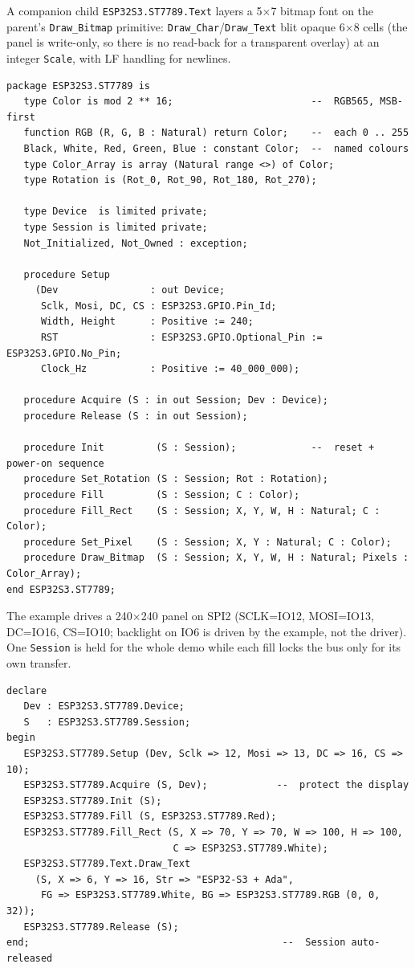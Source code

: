 A companion child \texttt{ESP32S3.ST7789.Text} layers a 5$\times$7 bitmap font on
the parent's \texttt{Draw\_Bitmap} primitive: \texttt{Draw\_Char}/\texttt{Draw\_Text}
blit opaque 6$\times$8 cells (the panel is write-only, so there is no read-back for a
transparent overlay) at an integer \texttt{Scale}, with LF handling for newlines.

\begin{lstlisting}
package ESP32S3.ST7789 is
   type Color is mod 2 ** 16;                        --  RGB565, MSB-first
   function RGB (R, G, B : Natural) return Color;    --  each 0 .. 255
   Black, White, Red, Green, Blue : constant Color;  --  named colours
   type Color_Array is array (Natural range <>) of Color;
   type Rotation is (Rot_0, Rot_90, Rot_180, Rot_270);

   type Device  is limited private;
   type Session is limited private;
   Not_Initialized, Not_Owned : exception;

   procedure Setup
     (Dev                : out Device;
      Sclk, Mosi, DC, CS : ESP32S3.GPIO.Pin_Id;
      Width, Height      : Positive := 240;
      RST                : ESP32S3.GPIO.Optional_Pin := ESP32S3.GPIO.No_Pin;
      Clock_Hz           : Positive := 40_000_000);

   procedure Acquire (S : in out Session; Dev : Device);
   procedure Release (S : in out Session);

   procedure Init         (S : Session);             --  reset + power-on sequence
   procedure Set_Rotation (S : Session; Rot : Rotation);
   procedure Fill         (S : Session; C : Color);
   procedure Fill_Rect    (S : Session; X, Y, W, H : Natural; C : Color);
   procedure Set_Pixel    (S : Session; X, Y : Natural; C : Color);
   procedure Draw_Bitmap  (S : Session; X, Y, W, H : Natural; Pixels : Color_Array);
end ESP32S3.ST7789;
\end{lstlisting}

The example drives a 240$\times$240 panel on SPI2 (SCLK=IO12, MOSI=IO13, DC=IO16,
CS=IO10; backlight on IO6 is driven by the example, not the driver). One
\texttt{Session} is held for the whole demo while each fill locks the bus only for
its own transfer.

\begin{lstlisting}
declare
   Dev : ESP32S3.ST7789.Device;
   S   : ESP32S3.ST7789.Session;
begin
   ESP32S3.ST7789.Setup (Dev, Sclk => 12, Mosi => 13, DC => 16, CS => 10);
   ESP32S3.ST7789.Acquire (S, Dev);            --  protect the display
   ESP32S3.ST7789.Init (S);
   ESP32S3.ST7789.Fill (S, ESP32S3.ST7789.Red);
   ESP32S3.ST7789.Fill_Rect (S, X => 70, Y => 70, W => 100, H => 100,
                             C => ESP32S3.ST7789.White);
   ESP32S3.ST7789.Text.Draw_Text
     (S, X => 6, Y => 16, Str => "ESP32-S3 + Ada",
      FG => ESP32S3.ST7789.White, BG => ESP32S3.ST7789.RGB (0, 0, 32));
   ESP32S3.ST7789.Release (S);
end;                                            --  Session auto-released
\end{lstlisting}

